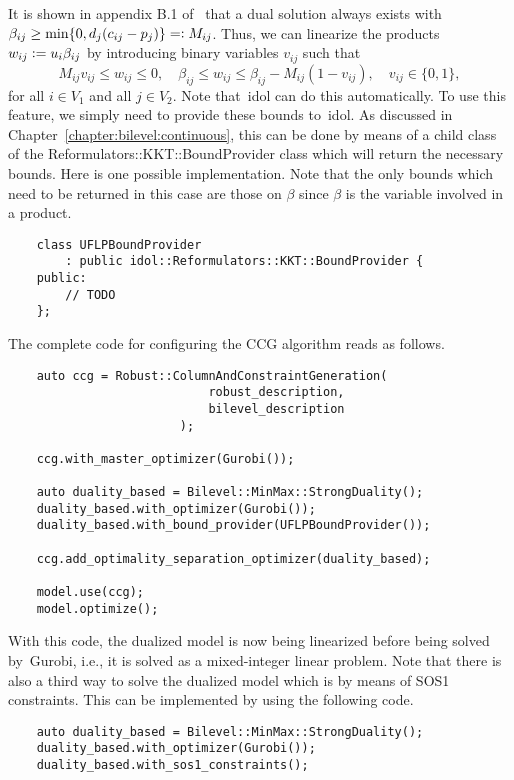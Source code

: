 It is shown in appendix B.1 of~\textcite{Cheng2021} that a dual solution
always exists with $\beta_{ij} \ge \min\{ 0, d_j(c_{ij} - p_j) \} \mathrel{{=}{\mathop:}}
M_{ij}$. Thus, we can linearize the products $w_{ij} \mathrel{{\mathop:}{=}} u_i\beta_{ij}$ by
introducing binary variables $v_{ij}$ such that 
\begin{equation}
    M_{ij}v_{ij} \le w_{ij} \le 0, \quad 
    \beta_{ij} \le w_{ij} \le \beta_{ij} - M_{ij}(1 - v_{ij}), \quad 
    v_{ij} \in \{0,1\},
    \label{eq:ccg:uflp:dual:mccormick}
\end{equation}
for all $i\in V_1$ and all $j\in V_2$. Note that~\textsf{idol} can do this
automatically. To use this feature, we simply need to provide these bounds
to~\textsf{idol}. As discussed in Chapter~\ref{chapter:bilevel:continuous},
this can be done by means of a child class of the
\textsf{Reformulators::KKT::BoundProvider} class which will return the
necessary bounds. Here is one possible implementation. Note that the only
bounds which need to be returned in this case are those on $\beta$ since
$\beta$ is the variable involved in a product.
%
\begin{lstlisting}
    class UFLPBoundProvider
        : public idol::Reformulators::KKT::BoundProvider {
    public:
        // TODO
    };
\end{lstlisting}

The complete code for configuring the CCG algorithm reads as follows. 

\begin{lstlisting}
    auto ccg = Robust::ColumnAndConstraintGeneration(
                            robust_description,
                            bilevel_description
                        );
    
    ccg.with_master_optimizer(Gurobi());

    auto duality_based = Bilevel::MinMax::StrongDuality();
    duality_based.with_optimizer(Gurobi());
    duality_based.with_bound_provider(UFLPBoundProvider());

    ccg.add_optimality_separation_optimizer(duality_based);

    model.use(ccg);
    model.optimize();
\end{lstlisting}

With this code, the dualized model is now being linearized before being solved
by~\textsf{Gurobi}, i.e., it is solved as a mixed-integer linear problem. Note
that there is also a third way to solve the dualized model which is by means
of SOS1 constraints. This can be implemented by using the following code. 
%
\begin{lstlisting}
    auto duality_based = Bilevel::MinMax::StrongDuality();
    duality_based.with_optimizer(Gurobi());
    duality_based.with_sos1_constraints();
\end{lstlisting} 

